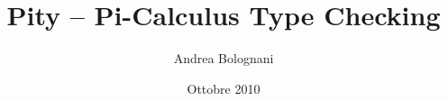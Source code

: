 \documentclass[a4paper]{article}
\begin{document}
\title{Pity -- Pi-Calculus Type Checking}
\author{Andrea Bolognani}
\date{Ottobre 2010}

\maketitle


\begin{abstract}

\end{abstract}


\clearpage

\tableofcontents

\clearpage











\end{document}
